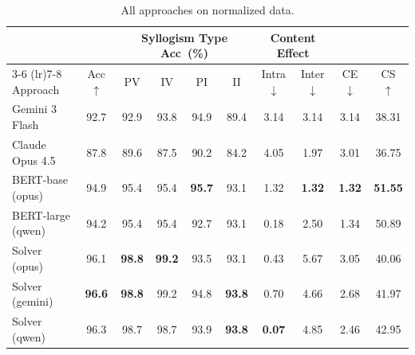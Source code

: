 \begin{table}[t]
  \centering
  \caption{All approaches on normalized data.}
  \label{tab:comprehensive_normalized}
  \begin{tabular}{l ccccc cc cc}
    \toprule
    & & \multicolumn{4}{c}{Syllogism Type Acc~(\%)} & \multicolumn{2}{c}{Content Effect} & & \\
    \cmidrule(lr){3-6} \cmidrule(lr){7-8}
    Approach & Acc $\uparrow$ & PV & IV & PI & II & Intra $\downarrow$ & Inter $\downarrow$ & CE $\downarrow$ & CS $\uparrow$ \\
    \midrule
    Gemini 3 Flash & 92.7 & 92.9 & 93.8 & 94.9 & 89.4 & 3.14 & 3.14 & 3.14 & 38.31 \\
    Claude Opus 4.5 & 87.8 & 89.6 & 87.5 & 90.2 & 84.2 & 4.05 & 1.97 & 3.01 & 36.75 \\
    \midrule
    BERT-base (opus) & 94.9 & 95.4 & 95.4 & \textbf{95.7} & 93.1 & 1.32 & \textbf{1.32} & \textbf{1.32} & \textbf{51.55} \\
    BERT-large (qwen) & 94.2 & 95.4 & 95.4 & 92.7 & 93.1 & 0.18 & 2.50 & 1.34 & 50.89 \\
    \midrule
    Solver (opus) & 96.1 & \textbf{98.8} & \textbf{99.2} & 93.5 & 93.1 & 0.43 & 5.67 & 3.05 & 40.06 \\
    Solver (gemini) & \textbf{96.6} & \textbf{98.8} & 99.2 & 94.8 & \textbf{93.8} & 0.70 & 4.66 & 2.68 & 41.97 \\
    Solver (qwen) & 96.3 & 98.7 & 98.7 & 93.9 & \textbf{93.8} & \textbf{0.07} & 4.85 & 2.46 & 42.95 \\
    \bottomrule
  \end{tabular}
\end{table}
